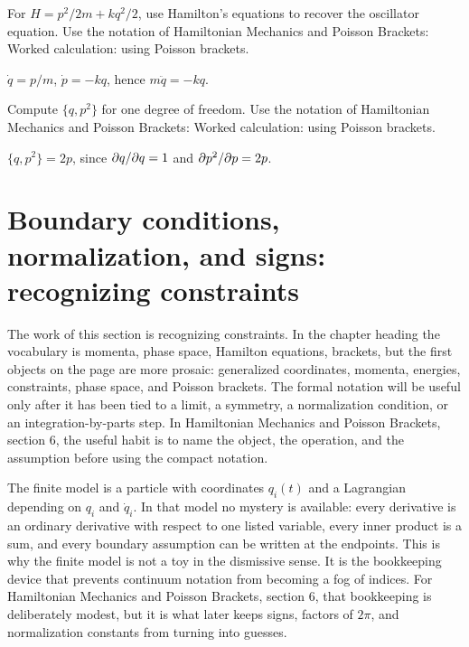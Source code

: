 \begin{exercise}
For \(H=p^2/2m+kq^2/2\), use Hamilton's equations to recover the oscillator equation.  Use the notation of Hamiltonian Mechanics and Poisson Brackets: Worked calculation: using Poisson brackets.
\begin{answer}
\(\dot q=p/m\), \(\dot p=-kq\), hence \(m\ddot q=-kq\).
\end{answer}
\end{exercise}

\begin{exercise}
Compute \(\{q,p^2\}\) for one degree of freedom.  Use the notation of Hamiltonian Mechanics and Poisson Brackets: Worked calculation: using Poisson brackets.
\begin{answer}
\(\{q,p^2\}=2p\), since \(\partial q/\partial q=1\) and \(\partial p^2/\partial p=2p\).
\end{answer}
\end{exercise}



\section{Boundary conditions, normalization, and signs: recognizing constraints}

The work of this section is recognizing constraints.  In the chapter heading the vocabulary is momenta, phase space, Hamilton equations, brackets, but the first objects on the page are more prosaic: generalized coordinates, momenta, energies, constraints, phase space, and Poisson brackets.  The formal notation will be useful only after it has been tied to a limit, a symmetry, a normalization condition, or an integration-by-parts step.  In Hamiltonian Mechanics and Poisson Brackets, section 6, the useful habit is to name the object, the operation, and the assumption before using the compact notation.

The finite model is a particle with coordinates \(q_i(t)\) and a Lagrangian depending on \(q_i\) and \(\dot q_i\).  In that model no mystery is available: every derivative is an ordinary derivative with respect to one listed variable, every inner product is a sum, and every boundary assumption can be written at the endpoints.  This is why the finite model is not a toy in the dismissive sense.  It is the bookkeeping device that prevents continuum notation from becoming a fog of indices.  For Hamiltonian Mechanics and Poisson Brackets, section 6, that bookkeeping is deliberately modest, but it is what later keeps signs, factors of \(2\pi\), and normalization constants from turning into guesses.


